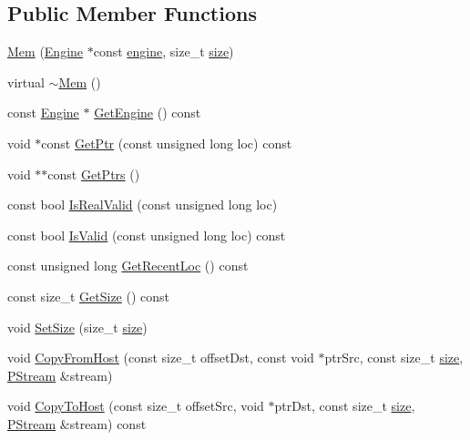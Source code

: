 \subsection*{Public Member Functions}
\begin{DoxyCompactItemize}
\item 
\hyperlink{classfractal_1_1Mem_a4b62d6cdc99c862d4d0aeca2bd1f67d4}{Mem} (\hyperlink{classfractal_1_1Engine}{Engine} $\ast$const \hyperlink{classfractal_1_1Mem_a36371a8e475f1aad6df2fc0243c0db58}{engine}, size\+\_\+t \hyperlink{classfractal_1_1Mem_a4bddc66ce0aa9b7a58418645f840f537}{size})
\item 
virtual \hyperlink{classfractal_1_1Mem_aa2fd1f08e88a38a2ec92d882e23a05ac}{$\sim$\+Mem} ()
\item 
const \hyperlink{classfractal_1_1Engine}{Engine} $\ast$ \hyperlink{classfractal_1_1Mem_ac8e506d4c690fed4e7247a8c1cf2e024}{Get\+Engine} () const 
\item 
void $\ast$const \hyperlink{classfractal_1_1Mem_a978e450c0bba7860c86f7b850aca0a8c}{Get\+Ptr} (const unsigned long loc) const 
\item 
void $\ast$$\ast$const \hyperlink{classfractal_1_1Mem_a9c3533baf2dcbdc104da53029e687710}{Get\+Ptrs} ()
\item 
const bool \hyperlink{classfractal_1_1Mem_ae1b9d2868628f25a489cebee833e9ae2}{Is\+Real\+Valid} (const unsigned long loc)
\item 
const bool \hyperlink{classfractal_1_1Mem_aff8487ed33c6a9130f04c913901ee074}{Is\+Valid} (const unsigned long loc) const 
\item 
const unsigned long \hyperlink{classfractal_1_1Mem_af6c5ae15ba7a93fbe8c817ac5795aac6}{Get\+Recent\+Loc} () const 
\item 
const size\+\_\+t \hyperlink{classfractal_1_1Mem_ad43670c786097e153ce1348e57ca615c}{Get\+Size} () const 
\item 
void \hyperlink{classfractal_1_1Mem_a5d69c5fadf2b5e28f1876bec6e01d92c}{Set\+Size} (size\+\_\+t \hyperlink{classfractal_1_1Mem_a4bddc66ce0aa9b7a58418645f840f537}{size})
\item 
void \hyperlink{classfractal_1_1Mem_a53625eca9f0dbaf09a39d175962c6f4b}{Copy\+From\+Host} (const size\+\_\+t offset\+Dst, const void $\ast$ptr\+Src, const size\+\_\+t \hyperlink{classfractal_1_1Mem_a4bddc66ce0aa9b7a58418645f840f537}{size}, \hyperlink{classfractal_1_1PStream}{P\+Stream} \&stream)
\item 
void \hyperlink{classfractal_1_1Mem_a5acd986b3c170d6800fa85f605466068}{Copy\+To\+Host} (const size\+\_\+t offset\+Src, void $\ast$ptr\+Dst, const size\+\_\+t \hyperlink{classfractal_1_1Mem_a4bddc66ce0aa9b7a58418645f840f537}{size}, \hyperlink{classfractal_1_1PStream}{P\+Stream} \&stream) const 
$$
\end{DoxyCompactItemize}
